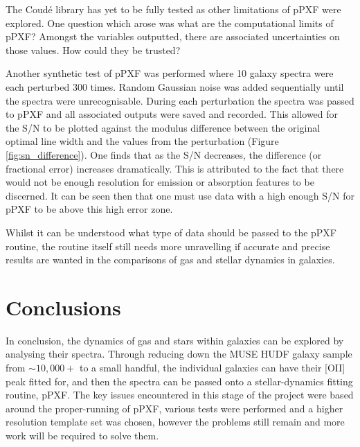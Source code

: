 \documentclass[12pt, twocolumn]{revtex4-1}    %
\begin{document}
The Coud{\'e} library has yet to be fully tested as other limitations of pPXF were explored. One question which arose was what are the computational limits of pPXF? Amongst the variables outputted, there are associated uncertainties on those values. How could they be trusted? 

Another synthetic test of pPXF was performed where 10 galaxy spectra were each perturbed 300 times. Random Gaussian noise was added sequentially until the spectra were unrecognisable. During each perturbation the spectra was passed to pPXF and all associated outputs were saved and recorded. This allowed for the S/N to be plotted against the modulus difference between the original optimal line width and the values from the perturbation (Figure \ref{fig:sn_difference}). One finds that as the S/N decreases, the difference (or fractional error) increases dramatically. This is attributed to the fact that there would not be enough resolution for emission or absorption features to be discerned. It can be seen then that one must use data with a high enough S/N for pPXF to be above this high error zone.


Whilst it can be understood what type of data should be passed to the pPXF routine, the routine itself still needs more unravelling if accurate and precise results are wanted in the comparisons of gas and stellar dynamics in galaxies.


%

\section{Conclusions}
\noindent
In conclusion, the dynamics of gas and stars within galaxies can be explored by analysing their spectra. Through reducing down the MUSE HUDF galaxy sample from $\sim10,000+$ to a small handful, the individual galaxies can have their [OII] peak fitted for, and then the spectra can be passed onto a stellar-dynamics fitting routine, pPXF. The key issues encountered in this stage of the project were based around the proper-running of pPXF, various tests were performed and a higher resolution template set was chosen, however the problems still remain and more work will be required to solve them.
\end{document}
